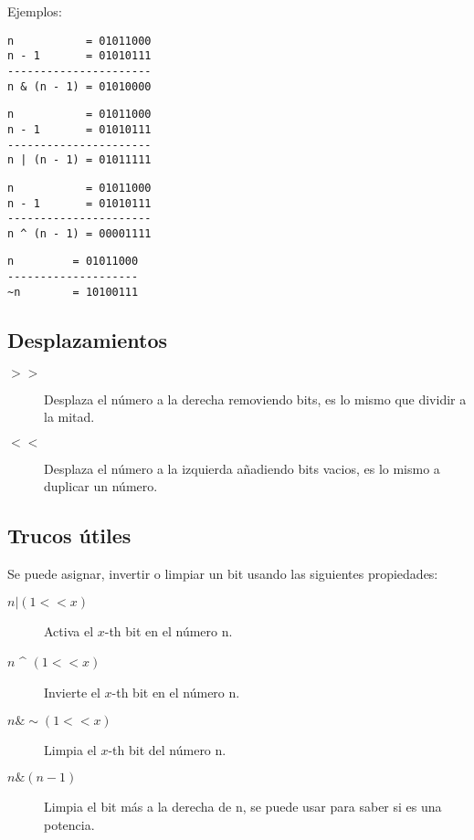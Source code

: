 \documentclass[11pt]{article}
\begin{document}
Ejemplos:

\begin{verbatim}
n           = 01011000
n - 1       = 01010111
----------------------
n & (n - 1) = 01010000
\end{verbatim}

\begin{verbatim}
n           = 01011000
n - 1       = 01010111
----------------------
n | (n - 1) = 01011111
\end{verbatim}

\begin{verbatim}
n           = 01011000
n - 1       = 01010111
----------------------
n ^ (n - 1) = 00001111
\end{verbatim}

\begin{verbatim}
n         = 01011000
--------------------
~n        = 10100111
\end{verbatim}

\subsection{Desplazamientos}

\begin{description}
    \item[$ >> $] Desplaza el número a la derecha removiendo bits, es lo mismo que dividir a la mitad.
    \item[$ << $] Desplaza el número a la izquierda añadiendo bits vacios, es lo mismo a duplicar un número.
\end{description}

\subsection{Trucos útiles}

Se puede asignar, invertir o limpiar un bit usando las siguientes propiedades:

\begin{description}
    \item[$ n | (1 << x) $] Activa el $x$-th bit en el número n.
    \item[$ n $ \^{} $ (1 << x) $] Invierte el $x$-th bit en el número n.
    \item[$ n \& \sim (1 << x) $] Limpia el $x$-th bit del número n.
    \item[$ n \& (n - 1) $] Limpia el bit más a la derecha de n, se puede usar para saber si es una potencia.
\end{description}
\end{document}
